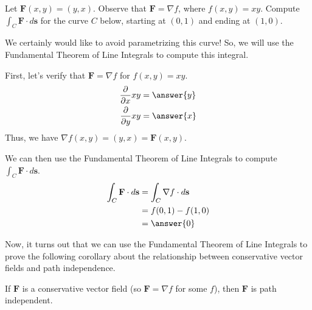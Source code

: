 \documentclass{ximera}
\begin{document}
\begin{example}
Let $\textbf{F}(x,y)=(y,x)$. Observe that $\textbf{F}=\nabla f$, where $f(x,y)=xy$. Compute $\int_C\textbf{F}\cdot d\textbf{s}$ for the curve $C$ below, starting at $(0,1)$ and ending at $(1,0)$.
\begin{center}
\end{center}
\begin{explanation}
We certainly would like to avoid parametrizing this curve! So, we will use the Fundamental Theorem of Line Integrals to compute this integral.

First, let's verify that $\textbf{F}=\nabla f$ for $f(x,y)=xy$.
\begin{align*}
\frac{\partial}{\partial x}xy &= \answer{y}\\
\frac{\partial}{\partial y}xy &= \answer{x}
\end{align*}
Thus, we have $\nabla f(x,y)= (y,x) = \textbf{F}(x,y)$.

We can then use the Fundamental Theorem of Line Integrals to compute $\int_C\textbf{F}\cdot d\textbf{s}$.
\begin{align*}
\int_C\textbf{F}\cdot d\textbf{s} &= \int_C\nabla f\cdot d\textbf{s}\\
&= f(0,1) - f(1,0)\\
&= \answer{0}
\end{align*}

\end{explanation}
\end{example}

Now, it turns out that we can use the Fundamental Theorem of Line Integrals to prove the following corollary about the relationship between conservative vector fields and path independence.

\begin{corollary}
If $\textbf{F}$ is a conservative vector field (so $\textbf{F}=\nabla f$ for some $f$), then $\textbf{F}$ is path independent.
\end{corollary}
\end{document}
